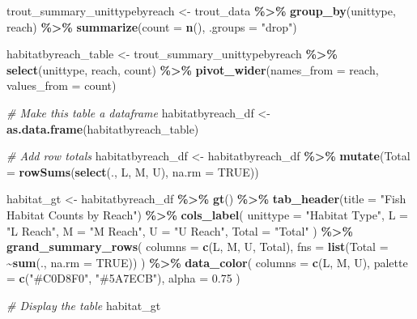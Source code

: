 \documentclass[
]{article}
\newenvironment{Shaded}{\begin{snugshade}}{\end{snugshade}}
\newcommand{\AttributeTok}[1]{\textcolor[rgb]{0.13,0.29,0.53}{#1}}
\newcommand{\CommentTok}[1]{\textcolor[rgb]{0.56,0.35,0.01}{\textit{#1}}}
\newcommand{\ConstantTok}[1]{\textcolor[rgb]{0.56,0.35,0.01}{#1}}
\newcommand{\FloatTok}[1]{\textcolor[rgb]{0.00,0.00,0.81}{#1}}
\newcommand{\FunctionTok}[1]{\textcolor[rgb]{0.13,0.29,0.53}{\textbf{#1}}}
\newcommand{\NormalTok}[1]{#1}
\newcommand{\OtherTok}[1]{\textcolor[rgb]{0.56,0.35,0.01}{#1}}
\newcommand{\SpecialCharTok}[1]{\textcolor[rgb]{0.81,0.36,0.00}{\textbf{#1}}}
\newcommand{\StringTok}[1]{\textcolor[rgb]{0.31,0.60,0.02}{#1}}
\begin{document}
\begin{Shaded}
\begin{Highlighting}[]
\NormalTok{trout\_summary\_unittypebyreach }\OtherTok{\textless{}{-}}\NormalTok{ trout\_data }\SpecialCharTok{\%\textgreater{}\%}
  \FunctionTok{group\_by}\NormalTok{(unittype, reach) }\SpecialCharTok{\%\textgreater{}\%}
  \FunctionTok{summarize}\NormalTok{(}\AttributeTok{count =} \FunctionTok{n}\NormalTok{(), }\AttributeTok{.groups =} \StringTok{"drop"}\NormalTok{)}

\NormalTok{habitatbyreach\_table }\OtherTok{\textless{}{-}}\NormalTok{ trout\_summary\_unittypebyreach }\SpecialCharTok{\%\textgreater{}\%}
  \FunctionTok{select}\NormalTok{(unittype, reach, count) }\SpecialCharTok{\%\textgreater{}\%} 
  \FunctionTok{pivot\_wider}\NormalTok{(}\AttributeTok{names\_from =}\NormalTok{ reach, }\AttributeTok{values\_from =}\NormalTok{ count)}

\CommentTok{\# Make this table a dataframe}
\NormalTok{habitatbyreach\_df }\OtherTok{\textless{}{-}} \FunctionTok{as.data.frame}\NormalTok{(habitatbyreach\_table)}

\CommentTok{\# Add row totals}
\NormalTok{habitatbyreach\_df }\OtherTok{\textless{}{-}}\NormalTok{ habitatbyreach\_df }\SpecialCharTok{\%\textgreater{}\%}
  \FunctionTok{mutate}\NormalTok{(}\AttributeTok{Total =} \FunctionTok{rowSums}\NormalTok{(}\FunctionTok{select}\NormalTok{(., L, M, U), }\AttributeTok{na.rm =} \ConstantTok{TRUE}\NormalTok{))}

\NormalTok{habitat\_gt }\OtherTok{\textless{}{-}}\NormalTok{ habitatbyreach\_df }\SpecialCharTok{\%\textgreater{}\%}
  \FunctionTok{gt}\NormalTok{() }\SpecialCharTok{\%\textgreater{}\%}
  \FunctionTok{tab\_header}\NormalTok{(}\AttributeTok{title =} \StringTok{"Fish Habitat Counts by Reach"}\NormalTok{) }\SpecialCharTok{\%\textgreater{}\%} 
  \FunctionTok{cols\_label}\NormalTok{(}
    \AttributeTok{unittype =} \StringTok{"Habitat Type"}\NormalTok{,}
    \AttributeTok{L =} \StringTok{"L Reach"}\NormalTok{,}
    \AttributeTok{M =} \StringTok{"M Reach"}\NormalTok{,}
    \AttributeTok{U =} \StringTok{"U Reach"}\NormalTok{,}
    \AttributeTok{Total =} \StringTok{"Total"} 
\NormalTok{  ) }\SpecialCharTok{\%\textgreater{}\%}
  \FunctionTok{grand\_summary\_rows}\NormalTok{(}
    \AttributeTok{columns =} \FunctionTok{c}\NormalTok{(L, M, U, Total),  }
    \AttributeTok{fns =} \FunctionTok{list}\NormalTok{(}\AttributeTok{Total =} \SpecialCharTok{\textasciitilde{}}\FunctionTok{sum}\NormalTok{(., }\AttributeTok{na.rm =} \ConstantTok{TRUE}\NormalTok{)) }
\NormalTok{  ) }\SpecialCharTok{\%\textgreater{}\%}
  \FunctionTok{data\_color}\NormalTok{(}
    \AttributeTok{columns =} \FunctionTok{c}\NormalTok{(L, M, U),}
    \AttributeTok{palette =} \FunctionTok{c}\NormalTok{(}\StringTok{"\#C0D8F0"}\NormalTok{, }\StringTok{"\#5A7ECB"}\NormalTok{),}
    \AttributeTok{alpha =} \FloatTok{0.75}
\NormalTok{  )}

\CommentTok{\# Display the table}
\NormalTok{habitat\_gt}
\end{Highlighting}
\end{Shaded}
\end{document}
